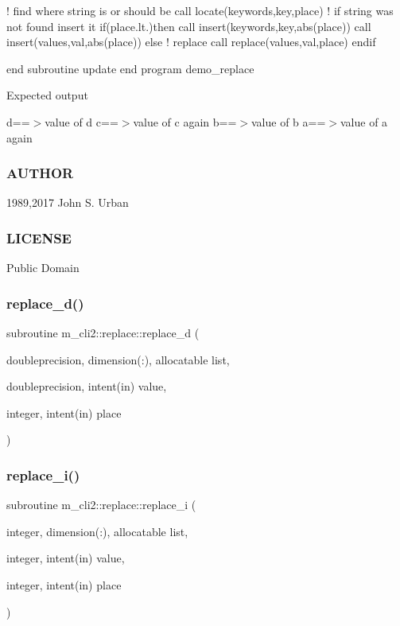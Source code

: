 ! find where string is or should be call locate(keywords,key,place) ! if string was not found insert it if(place.\+lt.)then call insert(keywords,key,abs(place)) call insert(values,val,abs(place)) else ! replace call replace(values,val,place) endif

end subroutine update end program demo\+\_\+replace

Expected output

d==$>$value of d c==$>$value of c again b==$>$value of b a==$>$value of a again

\subsubsection*{A\+U\+T\+H\+OR}

1989,2017 John S. Urban \subsubsection*{L\+I\+C\+E\+N\+SE}

Public Domain \mbox{\label{interfacem__cli2_1_1replace_a606ded35a3f0d06cb61a28db82ab5ae7}} 
\subsubsection{\texorpdfstring{replace\+\_\+d()}{replace\_d()}}
{\footnotesize\ttfamily subroutine m\+\_\+cli2\+::replace\+::replace\+\_\+d (\begin{DoxyParamCaption}\item[{doubleprecision, dimension(\+:), allocatable}]{list,  }\item[{doubleprecision, intent(in)}]{value,  }\item[{integer, intent(in)}]{place }\end{DoxyParamCaption})\hspace{0.3cm}{\ttfamily [private]}}

\mbox{\label{interfacem__cli2_1_1replace_a73a0dab38328c3db8a7eef48e27390bd}} 
\subsubsection{\texorpdfstring{replace\+\_\+i()}{replace\_i()}}
{\footnotesize\ttfamily subroutine m\+\_\+cli2\+::replace\+::replace\+\_\+i (\begin{DoxyParamCaption}\item[{integer, dimension(\+:), allocatable}]{list,  }\item[{integer, intent(in)}]{value,  }\item[{integer, intent(in)}]{place }\end{DoxyParamCaption})\hspace{0.3cm}{\ttfamily [private]}}

